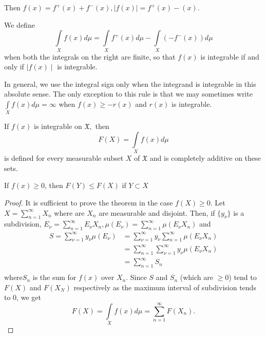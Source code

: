 Then $f(x) =  f^{+}(x) + f^{-} (x), \mid f(x) \mid  =  f^{+}(x) -(x)$.  

We define
\begin{equation*}
\int\limits_X  f(x) d \mu = \int\limits_{X} f^{+} (x)d \mu   -
\int\limits_{X} (-f^{-} (x)) d \mu 
\end{equation*}
when both the integrals  on the right are finite, so that $f(x)$ is
integrable if and only if $\mid f(x) \mid $ is integrable. 

In general, we use the integral sign only when the integrand is
integrable  in this absolute sense. The only exception to this  
rule is that we may sometimes write
$\int\limits_{X} f(x)d \mu    =  \infty$  when $f(x) \geq - r(x)$  and
$r(x)$ is integrable.  

\begin{theorem}\label{chap1:sec11:thm20} 
  If $f(x)$ is integrable on  $\mathfrak{X}, $  then 
\begin{equation*}
   F (X) =  \int\limits_{X}  f(x) d \mu 
\end{equation*}            
 is defined for every measurable subset  $X$  of $\mathfrak{X}$  and is
 completely additive  on these sets. 
\end{theorem}

\begin{coro*}  
  If $f(x) \geq  0$,  then $F(Y) \leq   F (X)  $   if  $Y \subset X$ 
\end{coro*}

\begin{proof}
  It is sufficient to prove  the  theorem in the case   $ f(X) \geq 0 $.  
  Let  $ X= \displaystyle \sum^{\infty}_{n=1} X_n$ where are $X_n$ are
  measurable and disjoint. Then, if $\{y_\nu\}$ is a subdivision, $E_\nu =
  \sum\limits^{\infty}_{n=1} E_{\nu} X_{n}, \mu
  (E_{\nu})=  \sum\limits^{\infty}_{n=1} \mu \left(E_{\nu} X_{n}\right)$ 
  and 
  \begin{align*}
    S = \sum^{\infty}_{\nu=1} y_{\nu}  \mu (E_{\nu}) & =
    \sum^{\infty}_{\nu=1}  y_{\nu}   \sum^{\infty}_{n=1} \mu (E_{\nu}
    X_{n}) \\ 
    & = \sum^{\infty}_{n=1}   \sum^{\infty}_{\nu=1}   y_{\nu}  \mu
    \left(E_{\nu} X_{n}\right) \\
    & = \sum^{\infty}_{n=1}  S_{n} \\
  \end{align*}  
  where\pageoriginale  $ S_{n}$ is the sum for  $f(x)$ over $ X_{n} $.  Since  $S$ and
$S_{n} $ (which are $\ge 0 $)  tend to  $F(X)$  and $ F(X_{N})$  
respectively as the maximum interval of subdivision tends  to 0, we get
$$ 
F(X) = \int\limits_{X}  f(x)d \mu = \sum^{\infty}_{n=1} F(X_{n}).
$$ 
\end{proof}

